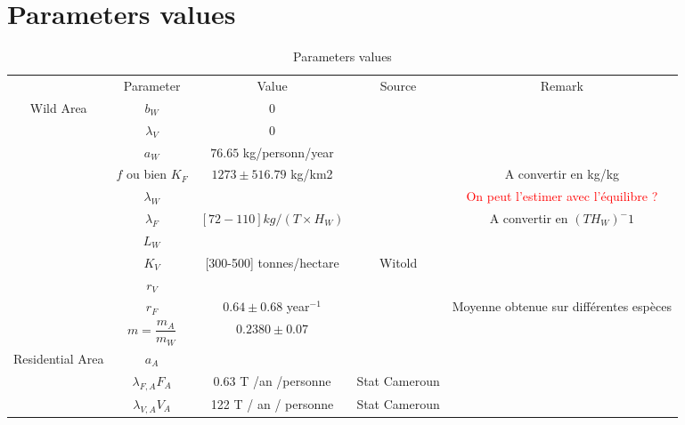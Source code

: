\documentclass{article}
\newcommand{\lfa}{\lambda_{F, A}}
\newcommand{\lva}{\lambda_{V, A}}
\newcommand{\lfw}{\lambda_{F}}
\newcommand{\lvw}{\lambda_{V}}
\newcommand{\lfv}{\lambda_{W}}
\newcommand{\marc}[1]{\textcolor{red}{#1}}
\begin{document}
\section{Parameters values}

\begin{table}[!ht]
\centering
\caption{Parameters values}
\begin{tabular}{c|c|c|c|c}
& Parameter & Value & Source & Remark \\
\cline{1-5}
\multirow{10}{*}{Wild Area} & $b_W$ & 0 & \cite{loung_pygmees_1996, koppert_consommation_1996, bennett_carrying_2000} & \\
& $\lvw$ & 0 & \cite{loung_pygmees_1996, koppert_consommation_1996, bennett_carrying_2000} &\\
& $a_W$ & $76.65$ kg/personn/year & \cite{koppert_consommation_1996, bennett_carrying_2000} \\
& $f$ ou bien $K_F$ & $1273 \pm 516.79$ kg/km2 & \cite{bennett_carrying_2000} & A convertir en kg/kg\\
& $\lfv$ & & & \marc{On peut l'estimer avec l'équilibre ?}\\
& $\lfw$ & $[72-110] kg/(T\times H_W)$ &\cite{avila_interpreting_2019, jones_consequences_2020} & A convertir en $(T H_W)^-1$\\
& $L_W$ \\
& $K_V$ & [300-500] tonnes/hectare & Witold & \\
& $r_V$ \\
& $r_F$ & $0.64 \pm 0.68$ year$^{-1}$ & \cite{bennett_carrying_2000} & Moyenne obtenue sur différentes espèces\\
& $m= \dfrac{m_A}{m_W}$ & $0.2380 \pm 0.07$ & \cite{avila_interpreting_2019} \\
\hline
\multirow{4}{*}{Residential Area} & $a_A$ & & \\
 & $\lfa F_A $ & 0.63 T /an /personne & Stat Cameroun \\
 & $\lva V_A $ &  122 T / an / personne & Stat Cameroun
\end{tabular}
\end{table}
\end{document}
